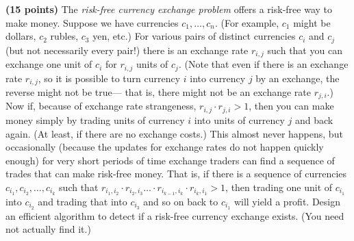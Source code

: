 \documentclass[11pt,letterpaper]{article}
\begin{document}
\begin{solution}
    
\end{solution}

\pagebreak
\begin{problem}
    {\bf (15 points)} The {\em risk-free currency exchange problem} offers a risk-free way to make money.  Suppose we have currencies $c_1,\ldots,c_n$. (For example, $c_1$ might be dollars, $c_2$ rubles, $c_3$ yen, etc.)  For various pairs of distinct currencies $c_i$ and $c_j$ (but not necessarily every pair!) there is an exchange rate $r_{i,j}$ such that you can exchange one unit of $c_i$ for $r_{i,j}$ units of $c_j$.  (Note that even if there is an exchange rate $r_{i,j}$, so it is possible to turn currency $i$ into currency $j$ by an exchange, the reverse might not be true--- that is, there might not be an exchange rate $r_{j,i}$.)  Now if, because of exchange rate strangeness, $r_{i,j} \cdot r_{j,i} > 1$, then you can make money simply by trading units of currency $i$ into units of currency $j$ and back again.  (At least, if there are no exchange costs.) This almost never happens, but occasionally (because the updates for exchange rates do not happen quickly enough) for very short periods of time exchange traders can find a sequence of trades that can make risk-free money. That is, if there is a sequence of currencies $c_{i_1},c_{i_2},\ldots,c_{i_k}$ such that $r_{{i_1},{i_2}} \cdot r_{{i_2},{i_3}} \ldots \cdot r_{{i_{k-1}},{i_k}} \cdot r_{{i_k},{i_1}} > 1$, then trading one unit of $c_{i_1}$ into $c_{i_2}$ and trading that into $c_{i_3}$ and so on back to $c_{i_1}$ will yield a profit.  Design an efficient algorithm to detect if a risk-free currency exchange exists. (You need not actually find it.)
\end{problem}
\end{document}
